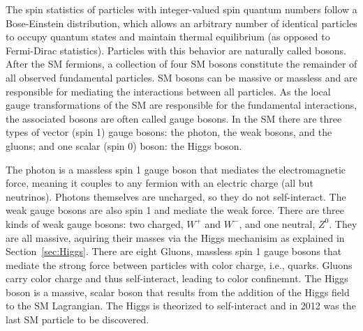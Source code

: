 The spin statistics of particles with integer-valued spin quantum numbers follow a Bose-Einstein distribution, which allows an arbitrary number of identical particles to occupy quantum states and maintain thermal equilibrium (as opposed to Fermi-Dirac statistics). Particles with this behavior are naturally called bosons. After the SM fermions, a collection of four SM bosons constitute the remainder of all observed fundamental particles. SM bosons can be massive or massless and are responsible for mediating the interactions between all particles. As the local gauge transformations of the SM are responsible for the fundamental interactions, the associated bosons are often called gauge bosons. In the SM there are three types of vector (spin 1) gauge bosons: the photon, the weak bosons, and the gluons; and one scalar (spin 0) boson: the Higgs boson. 

The photon is a massless spin 1 gauge boson that mediates the electromagnetic force, meaning it couples to any fermion with an electric charge (all but neutrinos). Photons themselves are uncharged, so they do not self-interact. The weak gauge bosons are also spin 1 and mediate the weak force. There are three kinds of weak gauge bosons: two charged, $W^+$ and $W^-$, and one neutral, $Z^0$. They are all massive, aquiring their masses via the Higgs mechanisim as explained in Section~\ref{sec:Higgs}. There are eight Gluons, massless spin 1 gauge bosons that mediate the strong force between particles with color charge, i.e., quarks. Gluons carry color charge and thus self-interact, leading to color confinemnt. The Higgs boson is a massive, scalar boson that results from the addition of the Higgs field to the SM Lagrangian. The Higgs is theorized to self-interact and in 2012 was the last SM particle to be discovered. 
